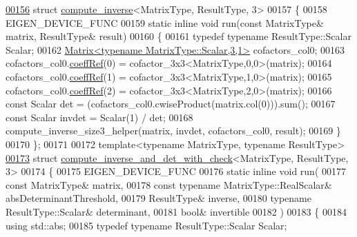\begin{DoxyCode}
\hyperlink{struct_eigen_1_1internal_1_1compute__inverse_3_01_matrix_type_00_01_result_type_00_013_01_4}{00156} \textcolor{keyword}{struct }\hyperlink{struct_eigen_1_1internal_1_1compute__inverse}{compute\_inverse}<MatrixType, ResultType, 3>
00157 \{
00158   EIGEN\_DEVICE\_FUNC
00159   \textcolor{keyword}{static} \textcolor{keyword}{inline} \textcolor{keywordtype}{void} run(\textcolor{keyword}{const} MatrixType& matrix, ResultType& result)
00160   \{
00161     \textcolor{keyword}{typedef} \textcolor{keyword}{typename} ResultType::Scalar Scalar;
00162     \hyperlink{group___core___module_class_eigen_1_1_matrix}{Matrix<typename MatrixType::Scalar,3,1>} cofactors\_col0;
00163     cofactors\_col0.\hyperlink{class_eigen_1_1_plain_object_base_a25626a55b26a4323565f79d1b7c48ea8}{coeffRef}(0) =  cofactor\_3x3<MatrixType,0,0>(matrix);
00164     cofactors\_col0.\hyperlink{class_eigen_1_1_plain_object_base_a25626a55b26a4323565f79d1b7c48ea8}{coeffRef}(1) =  cofactor\_3x3<MatrixType,1,0>(matrix);
00165     cofactors\_col0.\hyperlink{class_eigen_1_1_plain_object_base_a25626a55b26a4323565f79d1b7c48ea8}{coeffRef}(2) =  cofactor\_3x3<MatrixType,2,0>(matrix);
00166     \textcolor{keyword}{const} Scalar det = (cofactors\_col0.cwiseProduct(matrix.col(0))).sum();
00167     \textcolor{keyword}{const} Scalar invdet = Scalar(1) / det;
00168     compute\_inverse\_size3\_helper(matrix, invdet, cofactors\_col0, result);
00169   \}
00170 \};
00171 
00172 \textcolor{keyword}{template}<\textcolor{keyword}{typename} MatrixType, \textcolor{keyword}{typename} ResultType>
\hyperlink{struct_eigen_1_1internal_1_1compute__inverse__and__det__with__check_3_01_matrix_type_00_01_result_type_00_013_01_4}{00173} \textcolor{keyword}{struct }\hyperlink{struct_eigen_1_1internal_1_1compute__inverse__and__det__with__check}{compute\_inverse\_and\_det\_with\_check}<MatrixType, ResultType, 3>
00174 \{
00175   EIGEN\_DEVICE\_FUNC
00176   \textcolor{keyword}{static} \textcolor{keyword}{inline} \textcolor{keywordtype}{void} run(
00177     \textcolor{keyword}{const} MatrixType& matrix,
00178     \textcolor{keyword}{const} \textcolor{keyword}{typename} MatrixType::RealScalar& absDeterminantThreshold,
00179     ResultType& inverse,
00180     \textcolor{keyword}{typename} ResultType::Scalar& determinant,
00181     \textcolor{keywordtype}{bool}& invertible
00182   )
00183   \{
00184     \textcolor{keyword}{using} std::abs;
00185     \textcolor{keyword}{typedef} \textcolor{keyword}{typename} ResultType::Scalar Scalar;

\end{DoxyCode}
